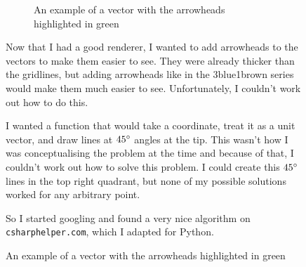 \documentclass[../development.tex]{subfiles}
\begin{document}
\begin{figure}[H]
	\hspace{0.005\linewidth}
	\centering
	\begin{minipage}{0.40\linewidth}
		\centering
		\begin{figure}[H]
			\centering
			\caption{An example of a vector with the arrowheads highlighted in green}
			\label{tikz:development:improving-the-gui:adding-vector-arrowheads}
		\end{figure}
	\end{minipage}%
	\hspace{0.015\linewidth}
	\begin{minipage}{0.56\linewidth}\setspacing
		Now that I had a good renderer, I wanted to add arrowheads to the vectors to make them easier to see. They were already thicker than the gridlines, but adding arrowheads like in the 3blue1brown series would make them much easier to see. Unfortunately, I couldn't work out how to do this.

		I wanted a function that would take a coordinate, treat it as a unit vector, and draw lines at $45\degree$ angles at the tip. This wasn't how I was conceptualising the problem at the time and because of that, I couldn't work out how to solve this problem. I could create this $45\degree$ lines in the top right quadrant, but none of my possible solutions worked for any arbitrary point.

		So I started googling and found a very nice algorithm on \texttt{csharphelper.com}\cite{csharphelper-arrowheads}\footnotemark, which I adapted for Python.
	\end{minipage}
	\hspace{0.005\linewidth}
	\vspace{-1em}
\end{figure}

\end{document}
